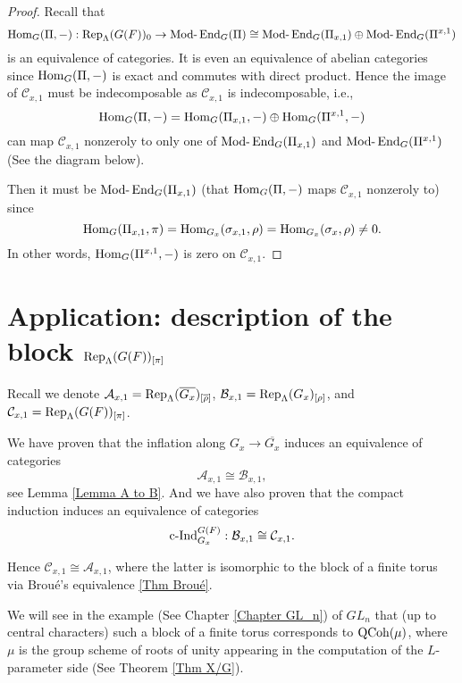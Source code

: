 	\begin{proof}
		Recall that 
		$$\operatorname{\operatorname{Hom}}_G(\Pi, -): \operatorname{\operatorname{Rep}}_{\Lambda}(G(F))_0 \to \operatorname{Mod-}\operatorname{\operatorname{End}}_G(\Pi) \cong \operatorname{Mod-}\operatorname{\operatorname{End}}_G(\Pi_{x,1}) \oplus \operatorname{Mod-}\operatorname{\operatorname{End}}_G(\Pi^{x,1})$$ 
		is an equivalence of categories. It is even an equivalence of abelian categories since $\operatorname{\operatorname{Hom}}_G(\Pi, -)$ is exact and commutes with direct product. Hence the image of $\mathcal{C}_{x,1}$ must be indecomposable as $\mathcal{C}_{x,1}$ is indecomposable, i.e., 
		$$\operatorname{\operatorname{Hom}}_G(\Pi, -)=\operatorname{\operatorname{Hom}}_G(\Pi_{x,1}, -) \oplus \operatorname{\operatorname{Hom}}_G(\Pi^{x,1}, -)$$
		can map $\mathcal{C}_{x,1}$ nonzeroly to only one of $\operatorname{Mod-}\operatorname{\operatorname{End}}_G(\Pi_{x,1})$ and $\operatorname{Mod-}\operatorname{\operatorname{End}}_G(\Pi^{x,1})$ (See the diagram below). 
		
		
		Then it must be $\operatorname{Mod-}\operatorname{\operatorname{End}}_G(\Pi_{x,1})$ (that $\operatorname{\operatorname{Hom}}_G(\Pi, -)$ maps $\mathcal{C}_{x,1}$ nonzeroly to) since 
		$$\operatorname{\operatorname{Hom}}_G(\Pi_{x,1}, \pi)=\operatorname{\operatorname{Hom}}_{G_x}(\sigma_{x,1}, \rho)=\operatorname{\operatorname{Hom}}_{G_x}(\sigma_x, \rho) \neq 0.$$
		In other words, $\operatorname{\operatorname{Hom}}_G(\Pi^{x,1}, -)$ is zero on $\mathcal{C}_{x,1}$.
		
	\end{proof}
	
	
	\section{Application: description of the block $\operatorname{\operatorname{Rep}}_{\Lambda}(G(F))_{[\pi]}$}\label{Section rep application}

    Recall we denote $\mathcal{A}_{x,1}=\operatorname{\operatorname{Rep}}_{\Lambda}(\overline{G_x})_{[\overline{\rho}]}$, $\mathcal{B}_{x,1}=\operatorname{\operatorname{Rep}}_{\Lambda}(G_x)_{[\rho]}$, and $\mathcal{C}_{x,1}=\operatorname{\operatorname{Rep}}_{\Lambda}(G(F))_{[\pi]}$.
    
    We have proven that the inflation along $G_x \to \overline{G_x}$ induces an equivalence of categories 
    $$\mathcal{A}_{x,1} \cong \mathcal{B}_{x,1},$$
    see Lemma \ref{Lemma A to B}. And we have also proven that the compact induction induces an equivalence of categories
    $$\operatorname{\operatorname{c-Ind}}_{G_x}^{G(F)}: \mathcal{B}_{x,1} \cong \mathcal{C}_{x,1}.$$
    
    Hence $\mathcal{C}_{x,1} \cong \mathcal{A}_{x,1}$, where the latter is isomorphic to the block of a finite torus via Broué's equivalence \ref{Thm Broué}.
    
    We will see in the example (See Chapter \ref{Chapter GL_n}) of $GL_n$ that (up to central characters) such a block of a finite torus corresponds to $\operatorname{\operatorname{QCoh}}(\mu)$, where $\mu$ is the group scheme of roots of unity appearing in the computation of the $L$-parameter side (See Theorem \ref{Thm X/G}).